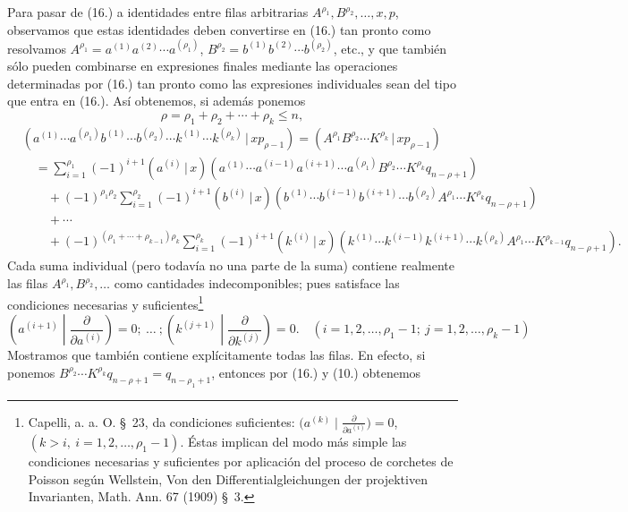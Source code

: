 \documentclass[11pt]{article}
\newcommand{\pair}[2]{(#1\,|\,#2)}
\begin{document}
Para pasar de (16.) a identidades entre filas arbitrarias $A^{\rho_1},B^{\rho_2},\ldots,x,p$, observamos que estas identidades deben convertirse en (16.) tan pronto como resolvamos
$A^{\rho_1}=a^{(1)}a^{(2)}\cdots a^{(\rho_1)}$, $B^{\rho_2}=b^{(1)}b^{(2)}\cdots b^{(\rho_2)}$, etc., y que también sólo pueden combinarse en expresiones finales mediante las operaciones determinadas por (16.) tan pronto como las expresiones individuales sean del tipo que entra en (16.). Así obtenemos, si además ponemos
\begin{equation}
 \rho=\rho_1+\rho_2+\cdots+\rho_k\le n,
\tag{18}
\end{equation}
\begin{align*}
&\pair{a^{(1)}\cdots a^{(\rho_1)}b^{(1)}\cdots b^{(\rho_2)}\cdots k^{(1)}\cdots k^{(\rho_k)}}{xp_{\rho-1}}
  =\pair{A^{\rho_1}B^{\rho_2}\cdots K^{\rho_k}}{xp_{\rho-1}} \\
&\quad=\sum_{i=1}^{\rho_1}(-1)^{i+1}\pair{a^{(i)}}{x}(a^{(1)}\cdots a^{(i-1)}a^{(i+1)}\cdots a^{(\rho_1)}B^{\rho_2}\cdots K^{\rho_k}q_{n-\rho+1})\\
&\qquad+(-1)^{\rho_1\rho_2}\sum_{i=1}^{\rho_2}(-1)^{i+1}\pair{b^{(i)}}{x}(b^{(1)}\cdots b^{(i-1)}b^{(i+1)}\cdots b^{(\rho_2)}A^{\rho_1}\cdots K^{\rho_k}q_{n-\rho+1})\\
&\qquad+\cdots\\
&\qquad+(-1)^{(\rho_1+\cdots+\rho_{k-1})\rho_k}\sum_{i=1}^{\rho_k}(-1)^{i+1}\pair{k^{(i)}}{x}(k^{(1)}\cdots k^{(i-1)}k^{(i+1)}\cdots k^{(\rho_k)}A^{\rho_1}\cdots K^{\rho_{k-1}}q_{n-\rho+1}).
\end{align*}
Cada suma individual (pero todavía no una parte de la suma) contiene realmente las filas $A^{\rho_1},B^{\rho_2},\ldots$ como cantidades indecomponibles; pues satisface las condiciones necesarias y suficientes\footnote{Capelli, a. a. O. \S\ 23, da condiciones suficientes: $\bigl(a^{(k)}\mid \frac{\partial}{\partial a^{(i)}}\bigr)=0$, $(k>i,\ i=1,2,\ldots,\rho_1-1)$. Éstas implican del modo más simple las condiciones necesarias y suficientes por aplicación del proceso de corchetes de Poisson según Wellstein, Von den Differentialgleichungen der projektiven Invarianten, Math. Ann. 67 (1909) \S\ 3.}
\begin{equation}
 \left(a^{(i+1)}\middle|\frac{\partial}{\partial a^{(i)}}\right)=0;\ \ldots\ ;
 \left(k^{(j+1)}\middle|\frac{\partial}{\partial k^{(j)}}\right)=0.
 \quad (i=1,2,\ldots,\rho_1-1;\ j=1,2,\ldots,\rho_k-1)
\tag{19}
\end{equation}
Mostramos que también contiene explícitamente todas las filas. En efecto, si ponemos $B^{\rho_2}\cdots K^{\rho_k}q_{n-\rho+1}=q_{n-\rho_1+1}$, entonces por (16.) y (10.) obtenemos
\end{document}
